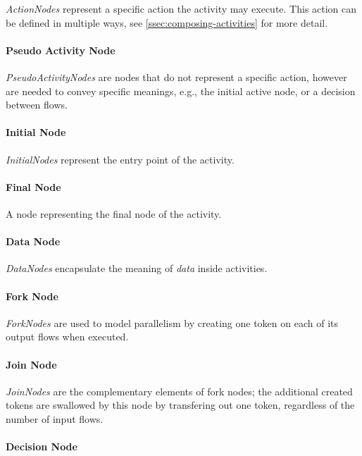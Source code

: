 \emph{ActionNodes} represent a specific action the activity may execute. This action can be defined in multiple ways, see \autoref{ssec:composing-activities} for more detail.

\paragraph{Pseudo Activity Node}

\emph{PseudoActivityNodes} are nodes that do not represent a specific action, however are needed to convey specific meanings, e.g., the initial active node, or a decision between flows.

\paragraph{Initial Node}

\emph{InitialNodes} represent the entry point of the activity.

\paragraph{Final Node}

A node representing the final node of the activity.

\paragraph{Data Node}

\emph{DataNodes} encapsulate the meaning of \emph{data} inside activities.

\paragraph{Fork Node}

\emph{ForkNodes} are used to model parallelism by creating one token on each of its output flows when executed.

\paragraph{Join Node}

\emph{JoinNodes} are the complementary elements of fork nodes; the additional created tokens are swallowed by this node by transfering out one token, regardless of the number of input flows.

\paragraph{Decision Node}

